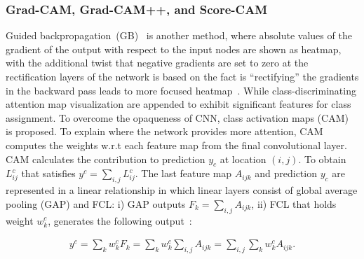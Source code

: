 \subsubsection{Grad-CAM, Grad-CAM++, and Score-CAM}
Guided backpropagation~(GB)~\cite{springenberg2014striving} is another method, where absolute values of the gradient of the output with respect to the input nodes are shown as heatmap, with the additional twist that negative gradients are set to zero at the rectification layers of the network is based on the fact is ``rectifying” the gradients in the backward pass leads to more focused heatmap~\cite{bohle2019layer}. While class-discriminating attention map visualization are appended to exhibit significant features for class assignment. To overcome the opaqueness of CNN, class activation maps (CAM)~\cite{zhou2016learning} is proposed. To explain where the network provides more attention, CAM computes the weights w.r.t each feature map from the final convolutional layer. CAM calculates the contribution to prediction $y_c$ at location $(i,j)$. To obtain $L_{ij}^{c}$ that satisfies $y^{c}=\sum_{i, j} L_{ij}^{c}$. The last feature map $A_{ijk}$ and prediction $y_c$ are represented in a linear relationship in which linear layers consist  of global average pooling (GAP) and FCL: i) GAP outputs $F_{k}=\sum_{i,j} A_{ijk}$, ii) FCL that holds weight $w_{k}^{c}$, generates the following output~\cite{kim2020extending}: 
 
 \vspace{-4mm}
 \begin{align}
     y^{c}=\sum_{k} w_{k}^{c} F_{k}=\sum_{k} w_{k}^{c} \sum_{i, j} A_{i j k}=\sum_{i, j} \sum_{k} w_{k}^{c} A_{i j k}.
 \end{align}
 \vspace{-4mm}
 
